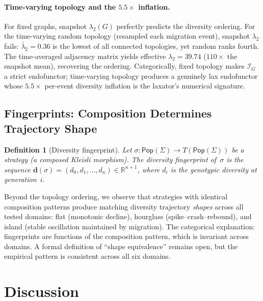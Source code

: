 \documentclass[submission,copyright,creativecommons]{eptcs}
\newtheorem{definition}{Definition}
\begin{document}
\paragraph{Time-varying topology and the $5.5\times$ inflation.}
For fixed graphs, snapshot $\lambda_2(G)$ perfectly predicts the
diversity ordering. For the time-varying random topology (resampled
each migration event), snapshot $\lambda_2$ fails:
$\bar{\lambda}_2 = 0.36$ is the lowest of all connected topologies,
yet random ranks fourth. The time-averaged adjacency matrix yields
effective $\lambda_2 = 39.74$ ($110\times$ the snapshot mean),
recovering the ordering. Categorically, fixed topology makes
$\mathcal{I}_G$ a strict endofunctor; time-varying topology produces
a genuinely lax endofunctor whose $5.5\times$ per-event diversity
inflation is the laxator's numerical signature.

\subsection{Fingerprints: Composition Determines Trajectory Shape}

\begin{definition}[Diversity fingerprint]
\label{def:fingerprint}
Let $\sigma : \mathsf{Pop}(\Sigma) \to T(\mathsf{Pop}(\Sigma))$ be a
strategy (a composed Kleisli morphism). The \emph{diversity fingerprint}
of~$\sigma$ is the sequence
$\mathbf{d}(\sigma) = (d_0, d_1, \ldots, d_n) \in \mathbb{R}^{n+1}$,
where $d_i$ is the genotypic diversity at generation~$i$.
\end{definition}

Beyond the topology ordering, we observe that strategies with
identical composition patterns produce matching diversity trajectory
\emph{shapes} across all tested domains: flat (monotonic decline),
hourglass (spike--crash--rebound), and island (stable oscillation
maintained by migration).
The categorical explanation: fingerprints are functions of the
composition pattern, which is invariant across domains. A formal
definition of ``shape equivalence'' remains open, but the empirical
pattern is consistent across all six domains.

\section{Discussion}
\label{sec:discussion}
\end{document}
